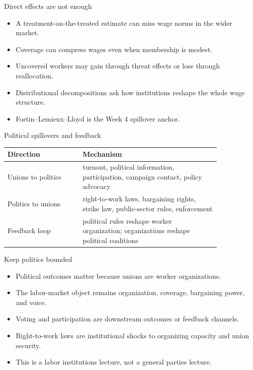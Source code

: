 \documentclass[aspectratio=169,11pt]{beamer}
\begin{document}
\begin{frame}{Direct effects are not enough}
\begin{itemize}
    \item A treatment-on-the-treated estimate can miss wage norms in the wider market.
    \item Coverage can compress wages even when membership is modest.
    \item Uncovered workers may gain through threat effects or lose through reallocation.
    \item Distributional decompositions ask how institutions reshape the whole wage structure.
    \item Fortin--Lemieux--Lloyd is the Week 4 spillover anchor.
\end{itemize}
\end{frame}

\begin{frame}{Political spillovers and feedback}
\small
\begin{tabular}{p{0.30\linewidth} p{0.55\linewidth}}
\toprule
Direction & Mechanism \\
\midrule
Unions to politics & turnout, political information, participation, campaign contact, policy advocacy \\
Politics to unions & right-to-work laws, bargaining rights, strike law, public-sector rules, enforcement \\
Feedback loop & political rules reshape worker organization; organizations reshape political coalitions \\
\bottomrule
\end{tabular}
\end{frame}

\begin{frame}{Keep politics bounded}
\begin{itemize}
    \item Political outcomes matter because unions are worker organizations.
    \item The labor-market object remains organization, coverage, bargaining power, and voice.
    \item Voting and participation are downstream outcomes or feedback channels.
    \item Right-to-work laws are institutional shocks to organizing capacity and union security.
    \item This is a labor institutions lecture, not a general parties lecture.
\end{itemize}
\end{frame}
\end{document}
